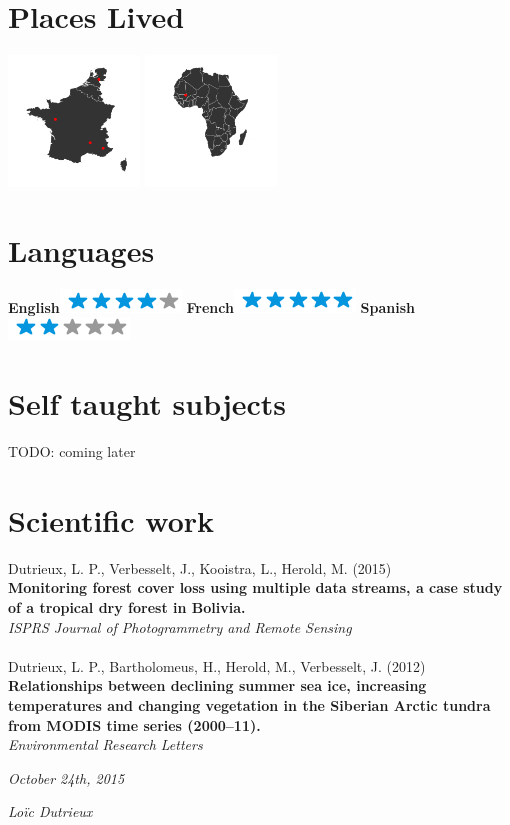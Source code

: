 \documentclass[]{friggeri-cv}
\begin{document}
\begin{aside}
~
~
~
  \section{Places Lived}
    \includegraphics[width=3.5cm]{img/map.png}
    \includegraphics[width=3.5cm]{img/mapAfrica.png}
    ~
  \section{Languages}
    \textbf{English}\includegraphics[scale=0.40]{img/4stars.png}
    \textbf{French}\includegraphics[scale=0.40]{img/5stars.png}
    \textbf{Spanish}\includegraphics[scale=0.40]{img/2stars.png}
\end{aside}

\section{Self taught subjects}
    TODO: coming later

\section{Scientific work}
    Dutrieux, L. P., Verbesselt, J., Kooistra, L., Herold, M. (2015)\\
    \textbf{Monitoring forest cover loss using multiple data streams, a case study of a tropical dry forest in Bolivia.}\\
    \textit{ISPRS Journal of Photogrammetry and Remote Sensing}\\
    \\
    Dutrieux, L. P., Bartholomeus, H., Herold, M., Verbesselt, J. (2012)\\
    \textbf{Relationships between declining summer sea ice, increasing temperatures and changing vegetation in the Siberian Arctic tundra from MODIS time series (2000–11).}\\
    \textit{Environmental Research Letters}\\


\begin{flushleft}
\emph{October 24th, 2015}
\end{flushleft}
\begin{flushright}
\emph{Lo\"{i}c Dutrieux}
\end{flushright}
\end{document}
